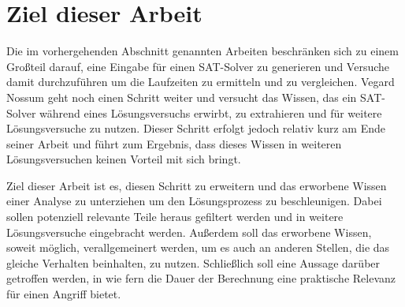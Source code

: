 \section{Ziel dieser Arbeit}

Die im vorhergehenden Abschnitt genannten Arbeiten beschränken sich zu einem Großteil darauf, eine Eingabe für
einen SAT-Solver zu generieren und Versuche damit durchzuführen um die Laufzeiten zu ermitteln und zu vergleichen.
Vegard Nossum geht noch einen Schritt weiter und versucht das Wissen, das ein SAT-Solver während eines Lösungsversuchs
erwirbt, zu extrahieren und für weitere Lösungsversuche zu nutzen. Dieser Schritt erfolgt jedoch relativ kurz am Ende
seiner Arbeit und führt zum Ergebnis, dass dieses Wissen in weiteren Lösungsversuchen keinen Vorteil mit sich bringt.

Ziel dieser Arbeit ist es, diesen Schritt zu erweitern und das erworbene Wissen einer Analyse zu unterziehen um den
Lösungsprozess zu beschleunigen. Dabei sollen potenziell relevante Teile heraus gefiltert werden und in weitere Lösungsversuche
eingebracht werden. Außerdem soll das erworbene Wissen, soweit möglich, verallgemeinert werden, um es auch an anderen Stellen,
die das gleiche Verhalten beinhalten, zu nutzen. Schließlich soll eine Aussage darüber getroffen werden, in wie fern die Dauer
der Berechnung eine praktische Relevanz für einen Angriff bietet.